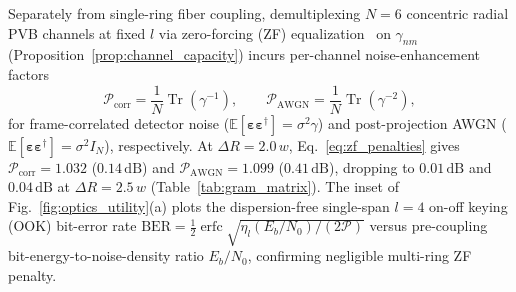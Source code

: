 \documentclass[aps,pra,onecolumn,notitlepage,11pt,tightenlines,amsmath,amssymb,floatfix,longbibliography]{revtex4-2}
\begin{document}
Separately from single-ring fiber coupling, demultiplexing $N = 6$ concentric radial PVB channels at fixed $l$ via zero-forcing (ZF) equalization~\cite{Willner2015,Wang2019,Proakis2008} on $\gamma_{nm}$ (Proposition~\ref{prop:channel_capacity}) incurs per-channel noise-enhancement factors
\begin{equation}
\mathcal{P}_{\mathrm{corr}} = \frac{1}{N}\operatorname{Tr}(\gamma^{-1}), \qquad \mathcal{P}_{\mathrm{AWGN}} = \frac{1}{N}\operatorname{Tr}(\gamma^{-2}),
\label{eq:zf_penalties}
\end{equation}
for frame-correlated detector noise ($\mathbb{E}[\boldsymbol{\varepsilon}\boldsymbol{\varepsilon}^\dagger] = \sigma^2 \gamma$) and post-projection AWGN ($\mathbb{E}[\boldsymbol{\varepsilon}\boldsymbol{\varepsilon}^\dagger] = \sigma^2 I_N$), respectively. At $\Delta R = 2.0\,w$, Eq.~\eqref{eq:zf_penalties} gives $\mathcal{P}_{\mathrm{corr}} = 1.032$ ($0.14\,\mathrm{dB}$) and $\mathcal{P}_{\mathrm{AWGN}} = 1.099$ ($0.41\,\mathrm{dB}$), dropping to $0.01\,\mathrm{dB}$ and $0.04\,\mathrm{dB}$ at $\Delta R = 2.5\,w$ (Table~\ref{tab:gram_matrix}). The inset of Fig.~\ref{fig:optics_utility}(a) plots the dispersion-free single-span $l = 4$ on-off keying (OOK) bit-error rate $\mathrm{BER} = \frac{1}{2}\operatorname{erfc}\sqrt{\eta_l (E_b/N_0)/(2\mathcal{P})}$ versus pre-coupling bit-energy-to-noise-density ratio $E_b/N_0$, confirming negligible multi-ring ZF penalty.
\end{document}
